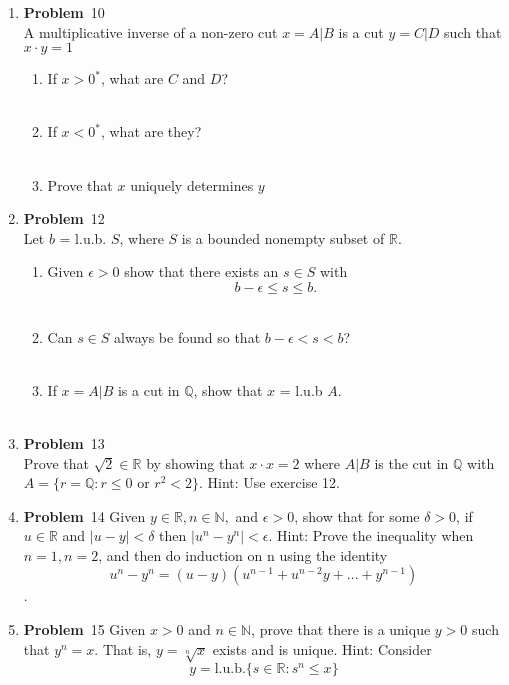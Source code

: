 \documentclass[12pt]{amsart}
\newcommand{\benu}{\begin{enumerate}}
\newcommand{\eenu}{\end{enumerate}}
\theoremstyle{definition}
\newcommand{\mbR}{\mathbb{R}}
\newcommand{\mbN}{\mathbb{N}}
\newcommand{\mbQ}{\mathbb{Q}}
\newcommand{\itep}{\item {\bfseries Problem}\ }
\begin{document}
\begin{enumerate}[series=p]
\newpage
\itep 10\\
A multiplicative inverse of a non-zero cut $x = A|B$ is a cut $y = C|D$ such that $x \cdot y = 1$
\benu
\item If $x > 0^*$, what are $C$ and $D$?\\
\\
\item If $x < 0^*$, what are they?\\
\\
\item Prove that $x$ uniquely determines $y$
\eenu

\newpage
\itep 12\\
Let $b$ = l.u.b. $S$, where $S$ is a bounded nonempty subset  of $\mbR$.
\benu
\item Given $\epsilon > 0$ show that there exists an $s \in S$ with
$$b - \epsilon \leq s \leq b.$$
\\
\item Can $s \in S$ always be found so that $b - \epsilon < s < b$?
\\
\\
\item If $x = A|B$ is a cut in $\mbQ$, show that $x$ = l.u.b $A$.
\\
\\
\eenu

\newpage
\itep 13\\
Prove that $\sqrt{2} \in \mbR$ by showing that $x \cdot x = 2$ where $A|B$ is the cut in $\mbQ$ with $A = \{r = \mbQ: r \leq 0 \text{ or } r^2 < 2\}$.  Hint: Use exercise 12.

\newpage
\itep 14
Given $y \in \mbR, n \in \mbN,$ and $\epsilon > 0$, show that for some $\delta > 0$, if $u \in \mbR$ and $|u-y| < \delta$ then $|u^n - y^n| < \epsilon$.  Hint: Prove the inequality when $n = 1, n = 2$, and then do induction on n using the identity
$$u^n - y^n = (u-y)(u^{n-1} + u^{n-2}y + \dots + y^{n-1})$$.

\newpage
\itep 15
Given $x > 0$ and $n \in \mbN$, prove that there is a unique $y > 0$ such that $y^n = x$.  That is, $y = \sqrt[n]{x}$ exists and is unique.  Hint: Consider
$$y = \text{l.u.b.}\{s \in \mbR : s^n \leq x\}$$


\end{enumerate}
\end{document}
